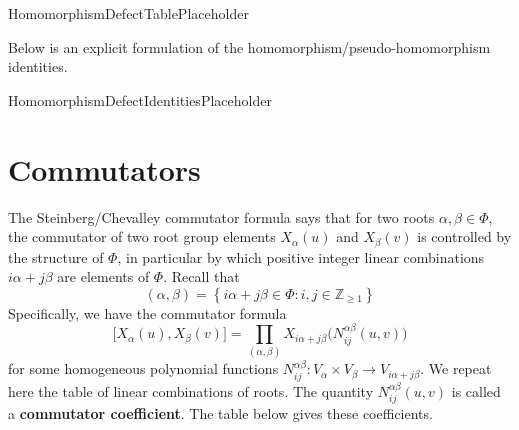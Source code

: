 \documentclass[11pt]{article}
\newcommand{\noi}{\noindent}
\newcommand{\tbf}{\textbf}
\newcommand{\lb}{\left\{}
\newcommand{\rb}{\right\}}
\newcommand{\Z}{\mathbb{Z}}
\theoremstyle{definition}
\newif\ifsummablepairs
\begin{document}
HomomorphismDefectTablePlaceholder

\bigskip

\noi Below is an explicit formulation of the homomorphism/pseudo-homomorphism identities.

\bigskip

HomomorphismDefectIdentitiesPlaceholder
\fi

\ifsummablepairs
\newpage
\section{Commutators}

The Steinberg/Chevalley commutator formula says that for two roots $\alpha, \beta \in \Phi$, the commutator of two root group elements $X_\alpha(u)$ and $X_\beta(v)$ is controlled by the structure of $\Phi$, in particular by which positive integer linear combinations $i\alpha + j\beta$ are elements of $\Phi$. Recall that
\[
	(\alpha, \beta) = \lb i \alpha + j\beta \in \Phi : i, j \in \Z_{\ge 1} \rb
\]
Specifically, we have the commutator formula
\[
	\Big[ X_\alpha(u), X_\beta(v) \Big] = \prod_{(\alpha, \beta)} X_{i\alpha + j\beta} \Big( N_{ij}^{\alpha \beta}(u,v) \Big)
\]
for some homogeneous polynomial functions $N_{ij}^{\alpha \beta}:V_{\alpha} \times V_{\beta} \to V_{i\alpha+j\beta}$. We repeat here the table of linear combinations of roots. The quantity $N_{ij}^{\alpha \beta}(u,v)$ is called a \tbf{commutator coefficient}. The table below gives these coefficients.

\bigskip
\end{document}
